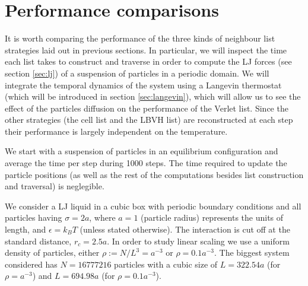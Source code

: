 \documentclass[ twoside,openright,titlepage,numbers=noenddot,%
headinclude,footinclude,cleardoublepage=empty,abstract=on,
BCOR=5mm,paper=b5,fontsize=11pt, dvipsnames
]{scrreprt}
\newcommand{\kT}{k_B T}
\begin{document}
\section{Performance comparisons}

It is worth comparing the performance of the three kinds of neighbour list strategies laid out in previous sections. In particular, we will inspect the time each list takes to construct and traverse in order to compute the \gls{LJ} forces (see section \ref{sec:lj}) of a suspension of particles in a periodic domain. We will integrate the temporal dynamics of the system using a Langevin thermostat (which will be introduced in section \ref{sec:langevin}), which will allow us to see the effect of the particles diffusion on the performance of the Verlet list. Since the other strategies (the cell list and the LBVH list) are reconstructed at each step their performance is largely independent on the temperature.

We start with a suspension of particles in an equilibrium configuration and average the time per step during 1000 steps. The time required to update the particle positions (as well as the rest of the computations besides list construction and traversal) is neglegible.

We consider a LJ liquid in a cubic box with periodic boundary conditions and all particles having $\sigma = 2a$, where $a=1$ (particle radius) represents the units of length, and $\epsilon = \kT$ (unless stated otherwise). The interaction is cut off at the standard distance, $r_c=2.5a$. In order to study linear scaling we use a uniform density of particles, either $\rho :=N/L^3= a^{-3}$ or $\rho = 0.1a^{-3}$. The biggest system considered has $N=16777216$ particles with a cubic size of $L=322.54a$ (for $\rho=a^{-3}$) and $L=694.98a$ (for $\rho=0.1a^{-3}$).
\end{document}
